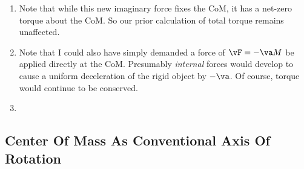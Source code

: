 \begin{enumerate}
  \item Note that while this new imaginary force fixes the CoM, it has a
  net-zero torque about the CoM. So our prior calculation of total
  torque remains unaffected.

  \item Note that I could also have simply demanded a force of $\vF =
  -\va M$ be applied directly at the CoM. Presumably \emph{internal}
  forces would develop to cause a uniform deceleration of the rigid
  object by $-\va$. Of course, torque would continue to be conserved.

  \item {}
\end{enumerate}

\subsection{Center Of Mass As Conventional Axis Of Rotation}

